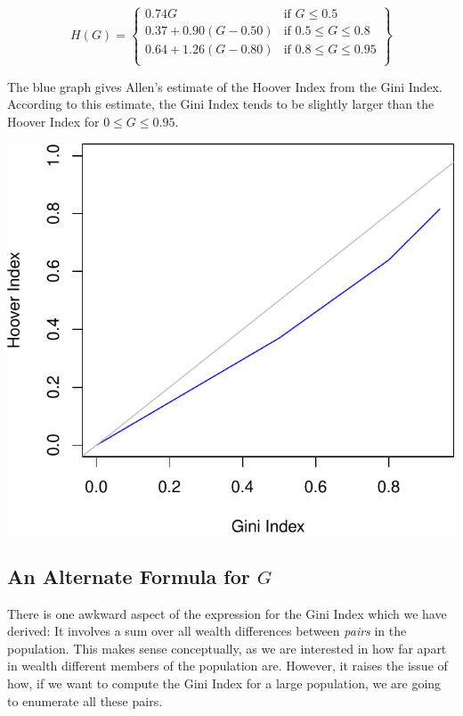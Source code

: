 \documentclass[12pt]{memoir}\usepackage[]{graphicx}\usepackage[table]{xcolor}
\makeatletter
\def\maxwidth{ %
  \ifdim\Gin@nat@width>\linewidth
    \linewidth
  \else
    \Gin@nat@width
  \fi
}
\newenvironment{knitrout}{}{} %
\makeatother
\begin{document}
\begin{equation*}
    H(G) = 
    \left\{
	\begin{array}{lr}
	    0.74G & \text{if } G \le 0.5 \\
	    0.37 + 0.90(G - 0.50) & \text{if } 0.5 \le G \le 0.8 \\
	    0.64 + 1.26(G - 0.80) & \text{if } 0.8 \le G \le 0.95 \\
	\end{array}
    \right\}
\end{equation*}

The blue graph gives Allen's estimate of the Hoover Index from the Gini Index.
According to this estimate, the Gini Index tends to be slightly larger than the 
Hoover Index for $0 \le G \le 0.95$.

\begin{knitrout}
\color{fgcolor}
\includegraphics[width=\maxwidth]{figure/unnamed-chunk-1-1} 
\end{knitrout}

\subsection*{An Alternate Formula for $G$}

There is one awkward aspect of the expression for the Gini Index which we have
derived:  It involves a sum over all wealth differences between \emph{pairs}
in the population.  This makes sense conceptually, as we are interested in 
how far apart in wealth different members of the population are.  However, it
raises the issue of how, if we want to compute the Gini Index for a large population,
we are going to enumerate all these pairs.
\end{document}
